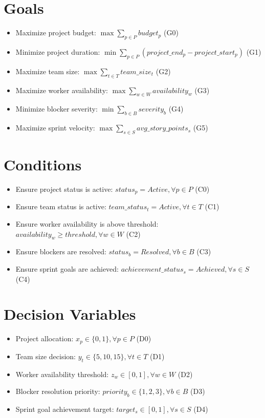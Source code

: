 \documentclass{article}
\begin{document}
\section{Goals}
\begin{itemize}
    \item Maximize project budget: $\max \sum_{p \in P} budget_p$ (G0)
    \item Minimize project duration: $\min \sum_{p \in P} (project\_end_p - project\_start_p)$ (G1)
    \item Maximize team size: $\max \sum_{t \in T} team\_size_t$ (G2)
    \item Maximize worker availability: $\max \sum_{w \in W} availability_w$ (G3)
    \item Minimize blocker severity: $\min \sum_{b \in B} severity_b$ (G4)
    \item Maximize sprint velocity: $\max \sum_{s \in S} avg\_story\_points_s$ (G5)
\end{itemize}

\section{Conditions}
\begin{itemize}
    \item Ensure project status is active: $status_p = Active, \forall p \in P$ (C0)
    \item Ensure team status is active: $team\_status_t = Active, \forall t \in T$ (C1)
    \item Ensure worker availability is above threshold: $availability_w \geq threshold, \forall w \in W$ (C2)
    \item Ensure blockers are resolved: $status_b = Resolved, \forall b \in B$ (C3)
    \item Ensure sprint goals are achieved: $achievement\_status_s = Achieved, \forall s \in S$ (C4)
\end{itemize}

\section{Decision Variables}
\begin{itemize}
    \item Project allocation: $x_p \in \{0,1\}, \forall p \in P$ (D0)
    \item Team size decision: $y_t \in \{5,10,15\}, \forall t \in T$ (D1)
    \item Worker availability threshold: $z_w \in [0,1], \forall w \in W$ (D2)
    \item Blocker resolution priority: $priority_b \in \{1,2,3\}, \forall b \in B$ (D3)
    \item Sprint goal achievement target: $target_s \in [0,1], \forall s \in S$ (D4)
\end{itemize}
\end{document}
